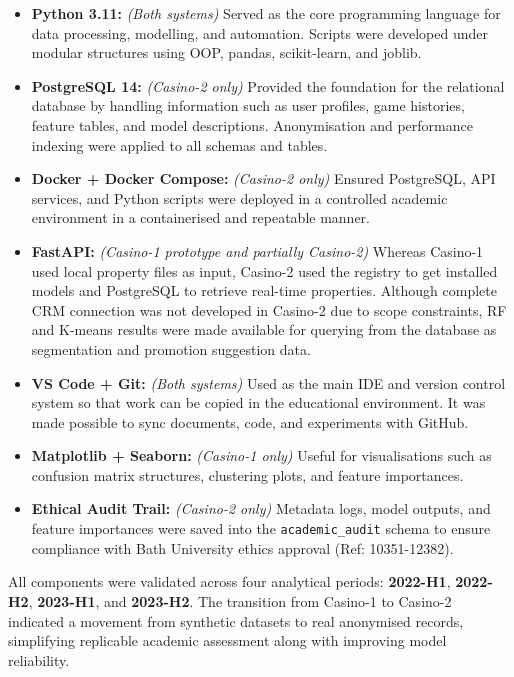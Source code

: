 \documentclass[12pt,a4paper]{report}
\begin{document}
\begin{itemize}
    \item \textbf{Python 3.11:} \textit{(Both systems)} Served as the core programming language for data processing, modelling, and automation. Scripts were developed under modular structures using OOP, pandas, scikit-learn, and joblib.

    \item \textbf{PostgreSQL 14:} \textit{(Casino-2 only)} Provided the foundation for the relational database by handling information such as user profiles, game histories, feature tables, and model descriptions.  Anonymisation and performance indexing were applied to all schemas and tables.

    \item \textbf{Docker + Docker Compose:} \textit{(Casino-2 only)} Ensured  PostgreSQL, API services, and Python scripts were deployed in a controlled academic environment in a containerised and repeatable manner.

    \item \textbf{FastAPI:} \textit{(Casino-1 prototype and partially Casino-2)} Whereas Casino-1 used local property files as input, Casino-2 used the registry to get installed models and PostgreSQL to retrieve real-time properties. Although complete CRM connection was not developed in Casino-2 due to scope constraints, RF and K-means results were made available for querying from the database as segmentation and promotion suggestion data.

    \item \textbf{VS Code + Git:} \textit{(Both systems)} Used as the main IDE and version control system so that work can be copied in the educational environment.  It was made possible to sync documents, code, and experiments with GitHub.

    \item \textbf{Matplotlib + Seaborn:} \textit{(Casino-1 only)} Useful for visualisations such as confusion matrix structures, clustering plots, and feature importances.

    \item \textbf{Ethical Audit Trail:} \textit{(Casino-2 only)} Metadata logs, model outputs, and feature importances were saved into the \texttt{academic\_audit} schema to ensure compliance with Bath University ethics approval (Ref: 10351-12382).

\end{itemize}

All components were validated across four analytical periods: \textbf{2022-H1}, \textbf{2022-H2}, \textbf{2023-H1}, and \textbf{2023-H2}. The transition from Casino-1 to Casino-2 indicated a movement from synthetic datasets to real anonymised records, simplifying replicable academic assessment along with improving model reliability.
\end{document}
